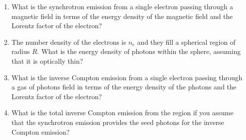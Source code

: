 \begin{enumerate}
\begin{enumerate}
\item
What is the synchrotron emission from a single electron passing
through a magnetic field in terms of the energy density of the
magnetic field and the Lorentz factor of the electron?
\item 
The number density of the electrons is $n_e$ and they fill a
spherical region of radius $R$.  What is the energy density of photons
within the sphere, assuming that it is optically thin?
\item
What is the inverse Compton emission from a single electron passing
through a gas of photons field in terms of the energy density of the
photons and the Lorentz factor of the electron?
\item
What is the total inverse Compton emission from the region if you
assume that the synchrotron emission provides the seed photons for the
inverse Compton emission?  
\end{enumerate}
\end{enumerate}
